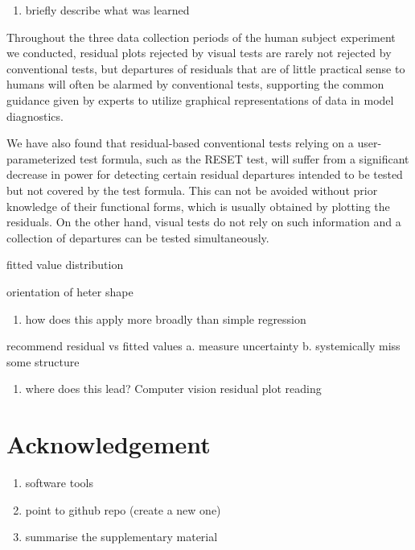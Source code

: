 \documentclass[]{interact}
\theoremstyle{plain}%
\theoremstyle{definition}
\theoremstyle{remark}
\providecommand{\tightlist}{%
  \setlength{\itemsep}{0pt}\setlength{\parskip}{0pt}}
\def\tightlist{}
\begin{document}
\begin{enumerate}
\def\labelenumi{\arabic{enumi}.}
\setcounter{enumi}{1}
\tightlist
\item
  briefly describe what was learned
\end{enumerate}

Throughout the three data collection periods of the human subject
experiment we conducted, residual plots rejected by visual tests are
rarely not rejected by conventional tests, but departures of residuals
that are of little practical sense to humans will often be alarmed by
conventional tests, supporting the common guidance given by experts to
utilize graphical representations of data in model diagnostics.

We have also found that residual-based conventional tests relying on a
user-parameterized test formula, such as the RESET test, will suffer
from a significant decrease in power for detecting certain residual
departures intended to be tested but not covered by the test formula.
This can not be avoided without prior knowledge of their functional
forms, which is usually obtained by plotting the residuals. On the other
hand, visual tests do not rely on such information and a collection of
departures can be tested simultaneously.

fitted value distribution

orientation of heter shape

\begin{enumerate}
\def\labelenumi{\arabic{enumi}.}
\setcounter{enumi}{2}
\tightlist
\item
  how does this apply more broadly than simple regression
\end{enumerate}

recommend residual vs fitted values a. measure uncertainty b.
systemically miss some structure

\begin{enumerate}
\def\labelenumi{\arabic{enumi}.}
\setcounter{enumi}{3}
\tightlist
\item
  where does this lead? Computer vision residual plot reading
\end{enumerate}

\hypertarget{acknowledgement}{%
\section{Acknowledgement}\label{acknowledgement}}

\begin{enumerate}
\def\labelenumi{\arabic{enumi}.}
\tightlist
\item
  software tools
\item
  point to github repo (create a new one)
\item
  summarise the supplementary material
\end{enumerate}
\end{document}

